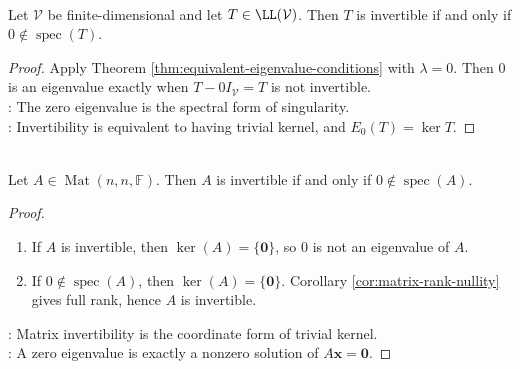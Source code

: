 \begin{corollary} \label{cor:invertible-iff-zero-not-eigenvalue} \\
Let $\mathcal{V}$ be finite-dimensional and let $T\in\LL(\mathcal{V})$. Then $T$ is invertible if and only if $0\notin\operatorname{spec}(T)$.
\begin{proof}
Apply Theorem \ref{thm:equivalent-eigenvalue-conditions} with $\lambda=0$. Then $0$ is an eigenvalue exactly when $T-0I_{\mathcal{V}}=T$ is not invertible.\\
: The zero eigenvalue is the spectral form of singularity.\\
: Invertibility is equivalent to having trivial kernel, and $E_0(T)=\ker T$.
\end{proof}
\end{corollary}

\begin{corollary} \label{cor:matrix-invertible-iff-zero-not-spectrum} \\
Let $A\in\operatorname{Mat}(n,n,\mathbb{F})$. Then $A$ is invertible if and only if $0\notin\operatorname{spec}(A)$.
\begin{proof}
\begin{enumerate}[label=\roman*.]
\setlength{\itemsep}{0pt}
\item[$(\Rightarrow)$] If $A$ is invertible, then $\ker(A)=\{\mathbf{0}\}$, so $0$ is not an eigenvalue of $A$.
\item[$(\Leftarrow)$] If $0\notin\operatorname{spec}(A)$, then $\ker(A)=\{\mathbf{0}\}$. Corollary \ref{cor:matrix-rank-nullity} gives full rank, hence $A$ is invertible.
\end{enumerate}
: Matrix invertibility is the coordinate form of trivial kernel.\\
: A zero eigenvalue is exactly a nonzero solution of $A\mathbf{x}=\mathbf{0}$.
\end{proof}
\end{corollary}
